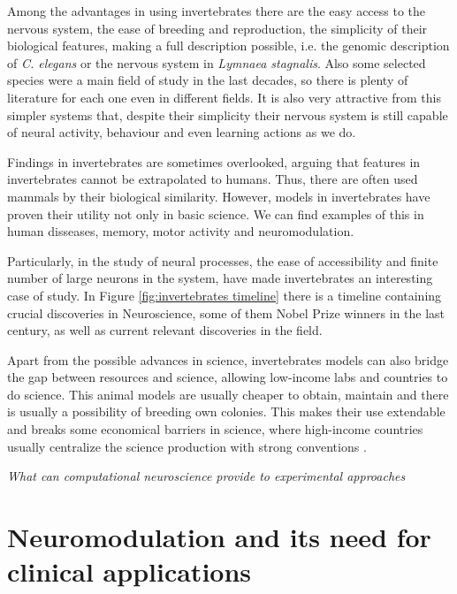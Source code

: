 
Among the advantages in using invertebrates there are the easy access to the nervous system, the ease of breeding and reproduction, the simplicity of their biological features, making a full description possible, i.e. the genomic description of \textit{C. elegans} or the nervous system in \textit{Lymnaea stagnalis}. Also some selected species were a main field of study in the last decades, so there is plenty of literature for each one even in different fields. It is also very attractive from this simpler systems that, despite their simplicity their nervous system is still capable of neural activity, behaviour and even learning actions as we do. 

Findings in invertebrates are sometimes overlooked, arguing that features in invertebrates cannot be extrapolated to humans. Thus, there are often used mammals by their biological similarity. However, models in invertebrates have proven their utility not only in basic science. We can find examples of this in human disseases, memory, motor activity and neuromodulation. 

Particularly, in the study of neural processes, the ease of accessibility and finite number of large neurons in the system, have made invertebrates an interesting case of study. In Figure \ref{fig:invertebrates timeline} there is a timeline containing crucial discoveries in Neuroscience, some of them Nobel Prize winners in the last century, as well as current relevant discoveries in the field. 

Apart from the possible advances in science, invertebrates models can also bridge the gap between resources and science, allowing low-income labs and countries to do science. This animal models are usually cheaper to obtain, maintain and there is usually a possibility of breeding own colonies. This makes their use extendable and breaks some economical barriers in science, where high-income countries usually centralize the science production with strong conventions \cite{castillo_spineless_2017,stephan_how_2015}. 

\textit{What can computational neuroscience provide to experimental approaches}
\section{Neuromodulation and its need for clinical applications}
